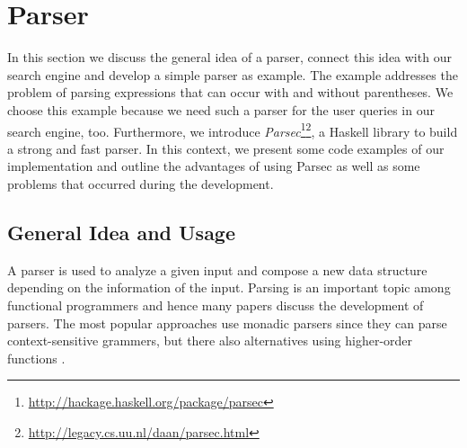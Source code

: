 \documentclass[%
	latex,%
	a4paper,%
	oneside,%
	chapterprefix,%
	headsepline,%
	12pt%
]{scrbook}
\begin{document}




 
\section{Parser}\label{implementation:parser}

In this section we discuss the general idea of a parser, connect this
idea with our search engine and develop a simple parser as example. %
The example addresses the problem of parsing expressions that can
occur with and without parentheses. %
We choose this example because we need such a parser for the user
queries in our search engine, too. %
Furthermore, we introduce
\emph{Parsec}\footnote{\url{http://hackage.haskell.org/package/parsec}}\footnote{\url{http://legacy.cs.uu.nl/daan/parsec.html}},
a Haskell library to build a strong and fast parser. %
In this context, we present some code examples of our implementation
and outline the advantages of using Parsec as well as some
problems that occurred during the development. %

\subsection{General Idea and Usage}

A parser is used to analyze a given input and compose a new data
structure depending on the information of the input. %
Parsing is an important topic among functional programmers and hence
many papers discuss the development of parsers. %
The most popular approaches use monadic parsers \cite{monpars} since
they can parse context-sensitive grammers, but there also alternatives
using higher-order functions \cite{funcpar}. %
\end{document}

